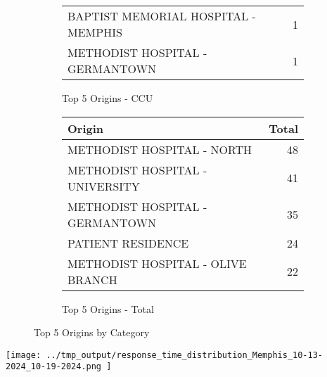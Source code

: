 \documentclass{article}
\begin{document}
\begin{figure}[htbp]
\begin{subfigure}[b]{0.45\textwidth}
\begin{tabular}{|l|r|}
                BAPTIST MEMORIAL HOSPITAL - MEMPHIS & 1 \\
            
                METHODIST HOSPITAL - GERMANTOWN & 1 \\
            
            \hline
        \end{tabular}
        \caption{Top 5 Origins - CCU}
    \end{subfigure}
    \hfill
    \begin{subfigure}[b]{0.45\textwidth}
        \centering
        \begin{tabular}{|l|r|}
            \hline
            Origin & Total \\
            \hline
            
                METHODIST HOSPITAL - NORTH & 48 \\
            
                METHODIST HOSPITAL - UNIVERSITY & 41 \\
            
                METHODIST HOSPITAL - GERMANTOWN & 35 \\
            
                PATIENT RESIDENCE & 24 \\
            
                METHODIST HOSPITAL - OLIVE BRANCH & 22 \\
            
            \hline
        \end{tabular}
        \caption{Top 5 Origins - Total}
    \end{subfigure}
    \caption{Top 5 Origins by Category}
\end{figure}

\texttt{[image:  ../tmp\_output/response\_time\_distribution\_Memphis\_10-13-2024\_10-19-2024.png ]}

\clearpage



\end{document}
